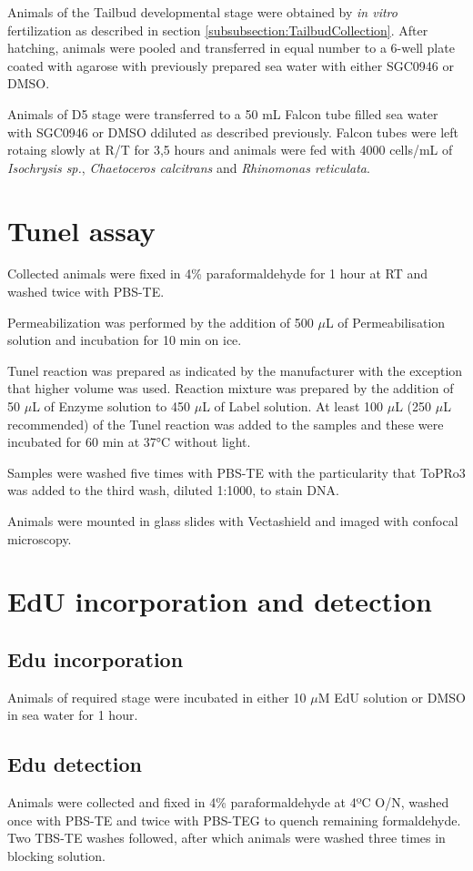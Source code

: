 \documentclass[11pt,twoside,a4paper]{report}
\begin{document}
		Animals of the Tailbud developmental stage were obtained by \textit{in vitro} fertilization as described in section \ref{subsubsection:TailbudCollection}. After hatching, animals were pooled and transferred in equal number to a 6-well plate coated with agarose with previously prepared sea water with either SGC0946 or DMSO.
		
		Animals of D5 stage were transferred to a 50 mL Falcon tube filled sea water with SGC0946 or DMSO ddiluted as described previously. Falcon tubes were left rotaing slowly at R/T for 3,5 hours and animals were fed with 4000 cells/mL of \textit{Isochrysis sp.}, \textit{Chaetoceros calcitrans} and \textit{Rhinomonas reticulata}.
	
	\section{Tunel assay}
		Collected animals were fixed in 4\% paraformaldehyde for 1 hour at RT and washed twice with PBS-TE.
	
		Permeabilization was performed by the addition of 500 $\mu$L of Permeabilisation solution and incubation for 10 min on ice.
	
		Tunel reaction was prepared as indicated by the manufacturer with the exception that higher volume was used. Reaction mixture was prepared by the addition of 50 $\mu$L of Enzyme solution to 450 $\mu$L of Label solution. At least 100 $\mu$L (250 $\mu$L recommended) of the Tunel reaction was added to the samples and these were incubated for 60 min at 37°C without light.
	
		Samples were washed five times with PBS-TE with the particularity that ToPRo3 was added to the third wash, diluted 1:1000, to stain DNA.
	
		Animals were mounted in glass slides with Vectashield and imaged with confocal microscopy.

	\section{EdU incorporation and detection}
		\subsection*{Edu incorporation}
			Animals of required stage were incubated in either 10 $\mu$M EdU solution or DMSO in sea water for 1 hour.
		\subsection*{Edu detection}
			Animals were collected and fixed in 4\% paraformaldehyde at 4ºC O/N, washed once with PBS-TE and twice with PBS-TEG to quench remaining formaldehyde. Two TBS-TE washes followed, after which animals were washed three times in blocking solution.
		
\end{document}
